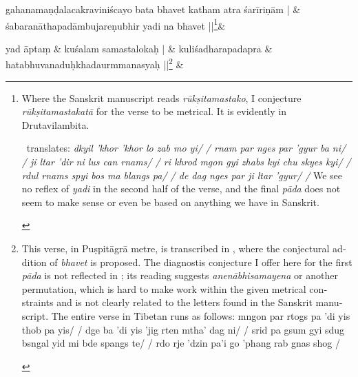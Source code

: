 \documentclass[naipra.tex]{subfiles}
\begin{document}
\begin{sanskrit}

\medskip\versequote
gahanamaṇḍalacakraviniścayo bata bhavet katham atra śarīriṇām | &
śabaranāthapadāmbujareṇubhir yadi na  bhavet ||\footnote{
	\begin{english}%
		Where the Sanskrit manuscript reads \emph{rūkṣitamastako}, I conjecture \emph{rūkṣitamastakatā} for the verse to be metrical.
		It is evidently in Drutavilambita.

		\TIB\ translates: \emph{%
			dkyil 'khor 'khor lo zab mo yi/ /%
			rnam par nges par 'gyur ba ni/ /%
			ji ltar 'dir ni lus can rnams/ /%
			ri khrod mgon gyi zhabs kyi chu skyes kyi/ /%
			rdul rnams spyi bos ma blangs pa/ /%
			de dag nges par ji ltar 'gyur/ /%
		} We see no reflex of \emph{yadi} in the second half of the verse, and the final \emph{pāda} does not seem to make sense or even be based on anything we have in Sanskrit.
	\end{english}
}\&

% 
%   


\medskip\versequote
{} yad āptaṃ &
\hspace{20pt} kuśalam  samastalokaḥ | \&
\versequote
kuliśadharapadapra &
\hspace{20pt} hatabhuvanaduḥkhadaurmmanasyaḥ ||\footnote{
	\begin{english}%
		This verse, in Puṣpitāgrā metre, is transcribed in \textcite[128]{isaacson2009}, where the conjectural addition of \emph{bhavet} is proposed.
		The diagnostis conjecture I offer here for the first \emph{pāda} is not reflected in \TIB ; its reading suggests \emph{anenābhisamayena} or another permutation, which is hard to make work within the given metrical constraints and is not clearly related to the letters found in the Sanskrit manuscript.
		The entire verse in Tibetan runs as follows:
			mngon par rtogs pa 'di yis thob pa yis/ /%
			dge ba 'di yis 'jig rten mtha' dag ni/ /%
			srid pa gsum gyi sdug bsngal yid mi bde spangs te/ /%
			rdo rje 'dzin pa'i go 'phang rab gnas shog /
	\end{english}
} \&


\end{sanskrit}
\end{document}
